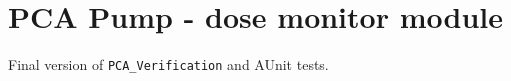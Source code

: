 
\cleardoublepage

\chapter{PCA Pump - dose monitor module}
\label{Appendix:pcapump:dose_monitor_module}

Final version of \lstinline{PCA_Verification} and AUnit tests.

